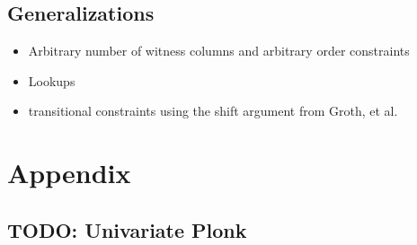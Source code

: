 \documentclass[11pt]{article}
\theoremstyle{definition}
\theoremstyle{remark}
\begin{document}
\subsection{Generalizations}

\begin{itemize}
\item
Arbitrary number of witness columns and arbitrary order constraints
\item
Lookups 
\item
transitional constraints using the shift argument from Groth, et al.
\end{itemize}







\appendix
\section{Appendix}
\label{s:Appendix}

\subsection{TODO: Univariate Plonk}
\label{s:UnivariatePlonk}



\end{document}
